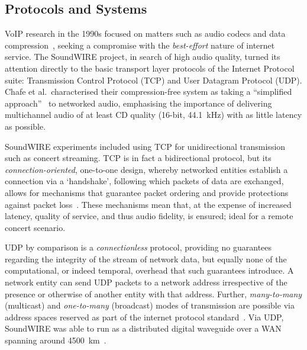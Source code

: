 \subsection{Protocols and Systems}\label{subsec:protocols-and-systems}

VoIP research in the 1990s focused on matters such as audio codecs and data
compression~\citep{turletti_inria_1995,hardman_successful_1998}, seeking a
compromise with the \textit{best-effort} nature of internet service.
The SoundWIRE project, in search of high audio quality, turned its attention
directly to the basic transport layer protocols of the Internet Protocol suite:
Transmission Control Protocol (TCP) and User Datagram Protocol (UDP).
Chafe et al.\ characterised their compression-free system as taking a
``simplified approach''~\citep{chafe_simplified_2000} to networked audio,
emphasising the importance of delivering multichannel audio of at least CD
quality (16-bit, \qty{44.1}{\kHz}) with as little latency as possible.

SoundWIRE experiments included using TCP for unidirectional transmission such as
concert streaming.
TCP is in fact a bidirectional protocol, but its \textit{connection-oriented},
one-to-one design, whereby networked entities establish a connection via a
`handshake', following which packets of data are exchanged, allows for
mechanisms that guarantee packet ordering and provide protections against packet
loss~\citep{schiavoni_alternatives_2013,al-dhief_performance_2018}.
These mechanisms mean that, at the expense of increased latency, quality of
service, and thus audio fidelity, is ensured; ideal for a remote concert
scenario.

UDP by comparison is a \textit{connectionless} protocol, providing no guarantees
regarding the integrity of the stream of network data, but equally none of the
computational, or indeed temporal, overhead that such guarantees introduce.
A network entity can send UDP packets to a network address irrespective of
the presence or otherwise of another entity with that address.
Further, \textit{many-to-many} (multicast) and \textit{one-to-many} (broadcast)
modes of transmission are possible via address spaces reserved as part of the
internet protocol standard~\citep{meyer_iana_2010}.
Via UDP, SoundWIRE was able to run as a distributed digital waveguide over a
WAN spanning around \qty{4500}{\km}~\citep{chafe_simplified_2000}.

